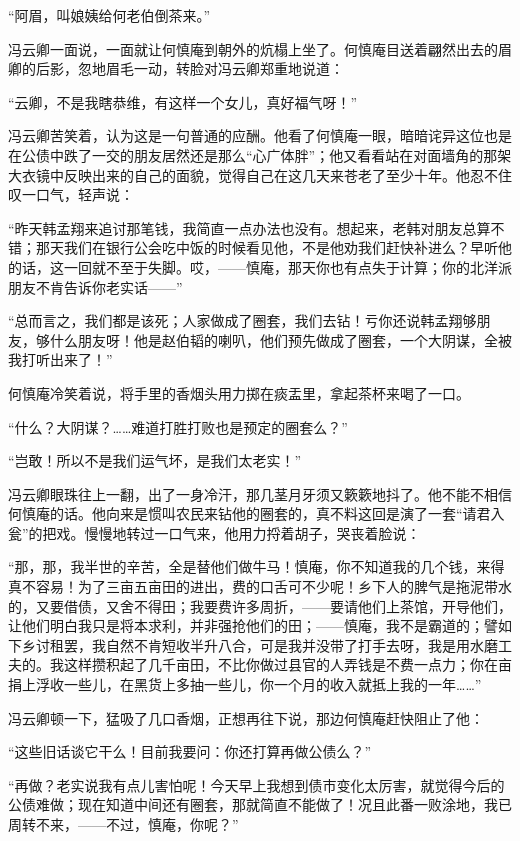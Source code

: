 \par “阿眉，叫娘姨给何老伯倒茶来。”
\par 冯云卿一面说，一面就让何慎庵到朝外的炕榻上坐了。何慎庵目送着翩然出去的眉卿的后影，忽地眉毛一动，转脸对冯云卿郑重地说道：
\par “云卿，不是我瞎恭维，有这样一个女儿，真好福气呀！”
\par 冯云卿苦笑着，认为这是一句普通的应酬。他看了何慎庵一眼，暗暗诧异这位也是在公债中跌了一交的朋友居然还是那么“心广体胖”；他又看看站在对面墙角的那架大衣镜中反映出来的自己的面貌，觉得自己在这几天来苍老了至少十年。他忍不住叹一口气，轻声说：
\par “昨天韩孟翔来追讨那笔钱，我简直一点办法也没有。想起来，老韩对朋友总算不错；那天我们在银行公会吃中饭的时候看见他，不是他劝我们赶快补进么？早听他的话，这一回就不至于失脚。哎，——慎庵，那天你也有点失于计算；你的北洋派朋友不肯告诉你老实话——”
\par “总而言之，我们都是该死；人家做成了圈套，我们去钻！亏你还说韩孟翔够朋友，够什么朋友呀！他是赵伯韬的喇叭，他们预先做成了圈套，一个大阴谋，全被我打听出来了！”
\par 何慎庵冷笑着说，将手里的香烟头用力掷在痰盂里，拿起茶杯来喝了一口。
\par “什么？大阴谋？……难道打胜打败也是预定的圈套么？”
\par “岂敢！所以不是我们运气坏，是我们太老实！”
\par 冯云卿眼珠往上一翻，出了一身冷汗，那几茎月牙须又簌簌地抖了。他不能不相信何慎庵的话。他向来是惯叫农民来钻他的圈套的，真不料这回是演了一套“请君入瓮”的把戏。慢慢地转过一口气来，他用力捋着胡子，哭丧着脸说：
\par “那，那，我半世的辛苦，全是替他们做牛马！慎庵，你不知道我的几个钱，来得真不容易！为了三亩五亩田的进出，费的口舌可不少呢！乡下人的脾气是拖泥带水的，又要借债，又舍不得田；我要费许多周折，——要请他们上茶馆，开导他们，让他们明白我只是将本求利，并非强抢他们的田；——慎庵，我不是霸道的；譬如下乡讨租罢，我自然不肯短收半升八合，可是我并没带了打手去呀，我是用水磨工夫的。我这样攒积起了几千亩田，不比你做过县官的人弄钱是不费一点力；你在亩捐上浮收一些儿，在黑货上多抽一些儿，你一个月的收入就抵上我的一年……”
\par 冯云卿顿一下，猛吸了几口香烟，正想再往下说，那边何慎庵赶快阻止了他：
\par “这些旧话谈它干么！目前我要问：你还打算再做公债么？”
\par “再做？老实说我有点儿害怕呢！今天早上我想到债市变化太厉害，就觉得今后的公债难做；现在知道中间还有圈套，那就简直不能做了！况且此番一败涂地，我已周转不来，——不过，慎庵，你呢？”
